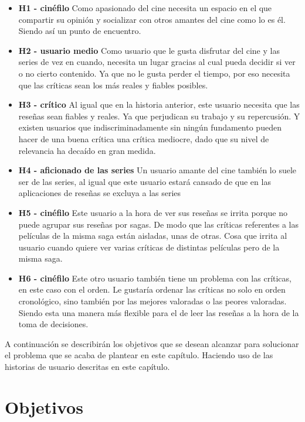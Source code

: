 \begin{itemize}
    \item \textbf{H1 - cinéfilo} Como apasionado del cine necesita un espacio en el que compartir su opinión y socializar con otros amantes del cine como lo es él. Siendo así un punto de encuentro. 
    \item \textbf{H2 - usuario medio} Como usuario que le gusta disfrutar del cine y las series de vez en cuando, necesita un lugar gracias al cual pueda decidir si ver o no cierto contenido. Ya que no le gusta perder el tiempo, por eso necesita que las críticas sean los más reales y fiables posibles.  
    \item \textbf{H3 - crítico} Al igual que en la historia anterior, este usuario necesita que las reseñas sean fiables y reales. Ya que perjudican su trabajo y su repercusión. Y existen usuarios que indiscriminadamente sin ningún fundamento pueden hacer de una buena crítica una crítica mediocre, dado que su nivel de relevancia ha decaído en gran medida.
    \item \textbf{H4 - aficionado de las series} Un usuario amante del cine también lo suele ser de las series, al igual que este usuario estará cansado de que en las aplicaciones de reseñas se excluya a las series
    \item \textbf{H5 - cinéfilo} Este usuario a la hora de ver sus reseñas se irrita porque no puede agrupar sus reseñas por sagas. De modo que las críticas referentes a las películas de la misma saga están aisladas, unas de otras. Cosa que irrita al usuario cuando quiere ver varias críticas de distintas películas pero de la misma saga.
    \item \textbf{H6 - cinéfilo} Este otro usuario también tiene un problema con las críticas, en este caso con el orden. Le gustaría ordenar las críticas no solo en orden cronológico, sino también por las mejores valoradas o las peores valoradas. Siendo esta una manera más flexible para el de leer las reseñas a la hora de la toma de decisiones.
\end{itemize}

A continuación se describirán los objetivos que se desean alcanzar para solucionar el problema que se 
acaba de plantear en este capítulo. Haciendo uso de las historias de usuario descritas en este capítulo.

\section{Objetivos}

